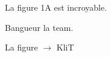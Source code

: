 \documentclass[12pt,a4paper]{article}
\begin{document}
\begin{analyse}
    La figure 1A est incroyable.

    Bangueur la team.

    \brouillon
    La figure $\rightarrow$ KliT
\end{analyse}
\end{document}
